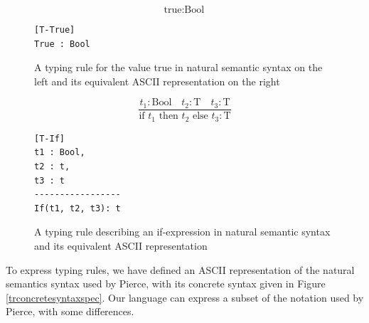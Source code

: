 \documentclass[nofilelist]{cslthse-msc}
\begin{document}
\begin{figure}[]
\centering
\begin{minipage}{.45\textwidth}
  \centering
  \begin{equation}
    \tag{T-True}
    \text{true} : \text{Bool}
  \end{equation}
\end{minipage}%
\hspace{.1\textwidth}\begin{minipage}{.45\textwidth}
  \centering
\begin{lstlisting}[]
[T-True]
True : Bool
\end{lstlisting}
\end{minipage}
\caption{A typing rule for the value true in natural semantic syntax on the left and its equivalent ASCII representation on the right}
\label{trexampletrue}
\end{figure}
\begin{figure}[]
\centering
\begin{minipage}{.45\textwidth}
  \centering
  \begin{equation}
    \tag{T-If}
    \frac{
      t_1 : \text{Bool}\quad
      t_2 : \text{T}\quad
      t_3 : \text{T}
    }{
      \text{if } t_1 \text{ then } t_2 \text{ else } t_3 : \text{T}
    }
  \end{equation}
\end{minipage}%
\hspace{.1\textwidth}\begin{minipage}{.45\textwidth}
  \centering
\begin{lstlisting}[]
[T-If]
t1 : Bool,
t2 : t,
t3 : t
-----------------
If(t1, t2, t3): t
\end{lstlisting}
\end{minipage}
\caption{A typing rule describing an if-expression in natural semantic syntax and its equivalent ASCII representation}
\label{trexampleif}
\end{figure}


To express typing rules, we have defined an ASCII representation of the natural semantics syntax used by Pierce\cite{Pierce}, with its concrete syntax given in Figure \ref{trconcretesyntaxspec}.
Our language can express a subset of the notation used by Pierce, with some differences.
\end{document}
